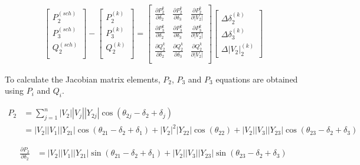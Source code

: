 \documentclass[11pt, oneside, reqno]{amsart}
\numberwithin{equation}{section}
\theoremstyle{plain}%
\theoremstyle{definition}
\theoremstyle{remark}
\begin{document}
\begin{align*}
	\begin{bmatrix}
		P^{(sch)}_2\\
		P^{(sch)}_3\\
		Q^{(sch)}_2\\
	\end{bmatrix}
	-
	\begin{bmatrix}
		P^{(k)}_2\\
		P^{(k)}_3\\
		Q^{(k)}_2\\
	\end{bmatrix}	
	=
	\begin{bmatrix}
		\frac{\partial P_2^k}{\partial\delta_2} & \frac{\partial P_2^k}{\partial \delta_3} & \frac{\partial P_2^k}{\partial |V_2|}\\
		\frac{\partial P_3^k}{\partial\delta_2} & \frac{\partial P_3^k}{\partial \delta_3} & \frac{\partial P_3^k}{\partial |V_2|}\\
		\frac{\partial Q_2^k}{\partial\delta_2} & \frac{\partial Q_2^k}{\partial \delta_3} & \frac{\partial Q_2^k}{\partial |V_2|}\\
	\end{bmatrix}
	\begin{bmatrix}
		\Delta \delta^{(k)}_2\\
		\Delta \delta^{(k)}_3\\
		\Delta |V_2|^{(k)}_2
	\end{bmatrix}
\end{align*}

To calculate the Jacobian matrix elements, $P_2$, $P_3$ and $P_3$ equations are obtained using $P_i$ and $Q_i$.

\begin{align*}
	P_2&=\sum^n_{j=1}|V_2||V_j||Y_{2j}|\cos(\theta_{2j}-\delta_2+\delta_j)\\
	&=|V_2||V_1||Y_{21}|\cos(\theta_{21}-\delta_2+\delta_1)+|V_2|^2|Y_{22}|\cos(\theta_{22})+|V_2||V_3||Y_{23}|\cos(\theta_{23}-\delta_2+\delta_3)
\end{align*}

\begin{align*}
	\frac{\partial P_2}{\partial\delta_2}&=|V_2||V_1||Y_{21}|\sin(\theta_{21}-\delta_2+\delta_1)+|V_2||V_3||Y_{23}|\sin(\theta_{23}-\delta_2+\delta_3)
\end{align*}
\end{document}
